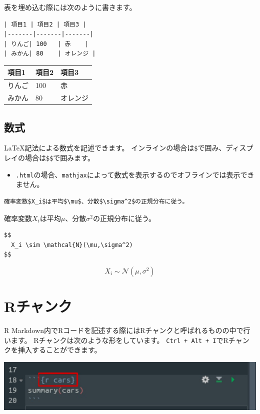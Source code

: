 \documentclass[]{bxjsreport}
\providecommand{\tightlist}{%
  \setlength{\itemsep}{0pt}\setlength{\parskip}{0pt}}
\let\asdf\section
\renewcommand{\section}{\chapter}
\let\asdff\subsection
\renewcommand{\subsection}{\asdf}
\renewcommand{\subsubsection}{\asdff}
\begin{document}
表を埋め込む際には次のように書きます。

\begin{verbatim}
| 項目1 | 項目2 | 項目3 |
|-------|-------|-------|
| りんご| 100   | 赤    |
| みかん| 80    | オレンジ |
\end{verbatim}

\begin{longtable}[]{@{}lll@{}}
\toprule
項目1 & 項目2 & 項目3\tabularnewline
\midrule
\endhead
りんご & 100 & 赤\tabularnewline
みかん & 80 & オレンジ\tabularnewline
\bottomrule
\end{longtable}

\hypertarget{ux6570ux5f0f}{%
\subsubsection{数式}\label{ux6570ux5f0f}}

LaTeX記法による数式を記述できます。
インラインの場合は\texttt{\$}で囲み、ディスプレイの場合は\texttt{\$\$}で囲みます。

\begin{itemize}
\tightlist
\item
  \texttt{.html}の場合、\texttt{mathjax}によって数式を表示するのでオフラインでは表示できません。
\end{itemize}

\begin{verbatim}
確率変数$X_i$は平均$\mu$、分散$\sigma^2$の正規分布に従う。
\end{verbatim}

確率変数\(X_i\)は平均\(\mu\)、分散\(\sigma^2\)の正規分布に従う。

\begin{verbatim}
$$
  X_i \sim \mathcal{N}(\mu,\sigma^2)
$$
\end{verbatim}

\[
  X_i \sim \mathcal{N}(\mu,\sigma^2)
\]

\hypertarget{Chunk}{%
\subsection{Rチャンク}\label{Chunk}}

R Markdown内でRコードを記述する際にはRチャンクと呼ばれるものの中で行います。
Rチャンクは次のような形をしています。
\texttt{Ctrl\ +\ Alt\ +\ I}でRチャンクを挿入することができます。

\includegraphics{figures/rmarkdown_html5_1.jpg}
\end{document}
